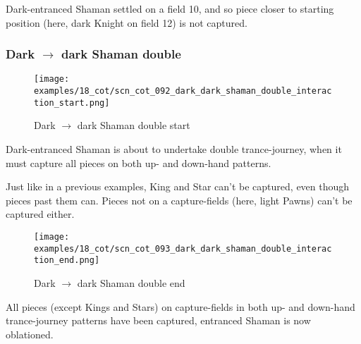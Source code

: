 Dark-entranced Shaman settled on a field 10, and so piece closer to starting position
(here, dark Knight on field 12) is not captured.

\clearpage %

\subsubsection*{Dark $\rightarrow$ dark Shaman double}
\label{sec:Conquest of Tlalocan/Trance-journey/Interactions/Dark --> dark Shaman double}

\vspace*{-1.4\baselineskip}
\noindent
\begin{figure}[!h]
\texttt{[image: examples/18\_cot/scn\_cot\_092\_dark\_dark\_shaman\_double\_interaction\_start.png]}
\caption{Dark $\rightarrow$ dark Shaman double start}
\label{fig:scn_cot_092_dark_dark_shaman_double_interaction_start}
\end{figure}

Dark-entranced Shaman is about to undertake double trance-journey, when it must
capture all pieces on both up- and down-hand patterns.

Just like in a previous examples, King and Star can't be captured, even though
pieces past them can. Pieces not on a capture-fields (here, light Pawns) can't
be captured either.

\clearpage %

\noindent
\begin{figure}[!h]
\texttt{[image: examples/18\_cot/scn\_cot\_093\_dark\_dark\_shaman\_double\_interaction\_end.png]}
\caption{Dark $\rightarrow$ dark Shaman double end}
\label{fig:scn_cot_093_dark_dark_shaman_double_interaction_end}
\end{figure}

All pieces (except Kings and Stars) on capture-fields in both up- and down-hand
trance-journey patterns have been captured, entranced Shaman is now oblationed.

\clearpage %

